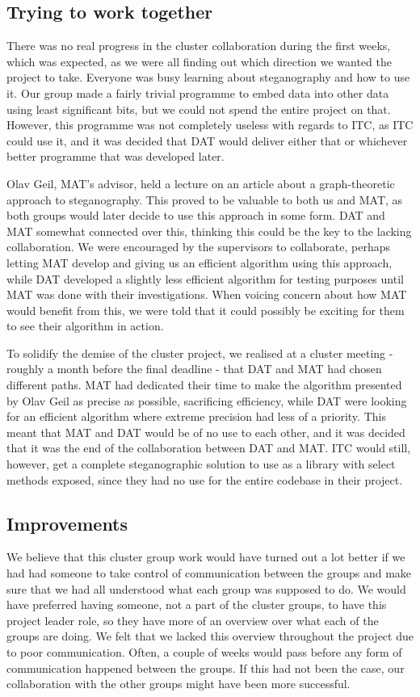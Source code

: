 \subsection*{Trying to work together}
There was no real progress in the cluster collaboration during the first weeks, which was expected, as we were all finding out which direction we wanted the project to take.
Everyone was busy learning about steganography and how to use it.
Our group made a fairly trivial programme to embed data into other data using least significant bits, but we could not spend the entire project on that.
However, this programme was not completely useless with regards to ITC, as ITC could use it, and it was decided that DAT would deliver either that or whichever better programme that was developed later.

Olav Geil, MAT's advisor, held a lecture on an article about a graph-theoretic approach to steganography.
This proved to be valuable to both us and MAT, as both groups would later decide to use this approach in some form.
DAT and MAT somewhat connected over this, thinking this could be the key to the lacking collaboration.
We were encouraged by the supervisors to collaborate, perhaps letting MAT develop and giving us an efficient algorithm using this approach, while DAT developed a slightly less efficient algorithm for testing purposes until MAT was done with their investigations.
When voicing concern about how MAT would benefit from this, we were told that it could possibly be exciting for them to see their algorithm in action.

To solidify the demise of the cluster project, we realised at a cluster meeting - roughly a month before the final deadline - that DAT and MAT had chosen different paths.
MAT had dedicated their time to make the algorithm presented by Olav Geil as precise as possible, sacrificing efficiency, while DAT were looking for an efficient algorithm where extreme precision had less of a priority.
This meant that MAT and DAT would be of no use to each other, and it was decided that it was the end of the collaboration between DAT and MAT.
ITC would still, however, get a complete steganographic solution to use as a library with select methods exposed, since they had no use for the entire codebase in their project.

\subsection*{Improvements}
We believe that this cluster group work would have turned out a lot better if we had had someone to take control of communication between the groups and make sure that we had all understood what each group was supposed to do. 
We would have preferred having someone, not a part of the cluster groups, to have this project leader role, so they have more of an overview over what each of the groups are doing.
We felt that we lacked this overview throughout the project due to poor communication.
Often, a couple of weeks would pass before any form of communication happened between the groups. 
If this had not been the case, our collaboration with the other groups might have been more successful. 

